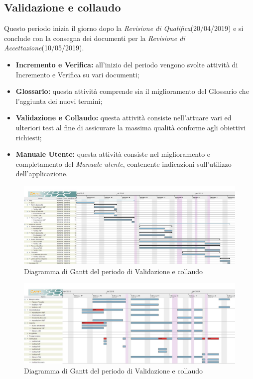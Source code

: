 \newpage
\subsection{Validazione e collaudo}
Questo periodo inizia il giorno dopo la  \textit{Revisione di Qualifica}(20/04/2019) e si conclude con la consegna dei documenti per la  \textit{Revisione di Accettazione}(10/05/2019). 
\begin{itemize}
	\item{\textbf{Incremento e Verifica:} all’inizio del periodo vengono svolte attività di Incremento e Verifica su vari documenti;}
	\item{\textbf{Glossario:} questa attività comprende sia il miglioramento del Glossario che l’aggiunta dei nuovi termini;}
	\item{\textbf{Validazione e Collaudo:} questa attività consiste nell'attuare vari ed ulteriori test al fine di assicurare la massima qualità conforme agli obiettivi richiesti;}
	\item{\textbf{Manuale Utente:} questa attività consiste nel miglioramento e completamento del \textit{Manuale utente}, contenente indicazioni sull’utilizzo dell’applicazione.}
\end{itemize}

\begin{figure}[h!]
	\centering
	\includegraphics[width=\textwidth]{Gantt_quarta_fase.jpg}
	\caption{Diagramma di Gantt del periodo di Validazione e collaudo}
\end{figure}

\begin{figure}[h!]
	\centering
	\includegraphics[width=\textwidth]{Gantt_quarta_fase_risorse.jpg}
	\caption{Diagramma di Gantt del periodo di Validazione e collaudo}
\end{figure}

